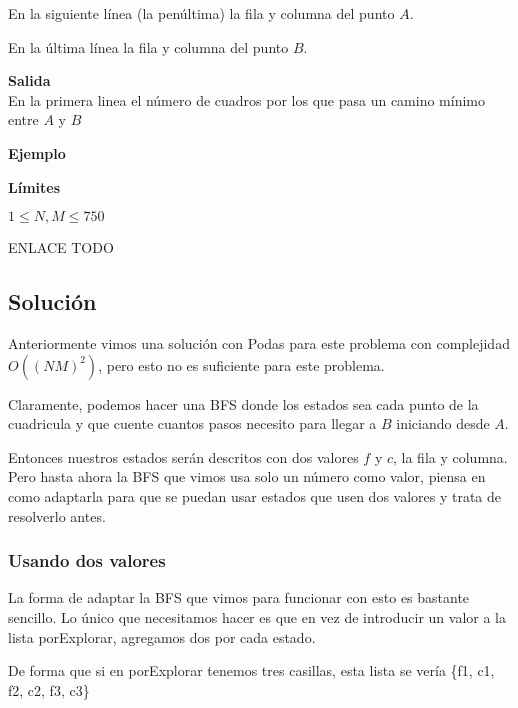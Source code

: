 En la siguiente línea (la penúltima) la fila y columna del punto \(A\).

En la última línea la fila y columna del punto \(B\).

\textbf{Salida}\\
En la primera linea el número de cuadros por los que pasa un camino mínimo entre \(A\) y \(B\)

\textbf{Ejemplo}\\
\begin{casebox2}
\end{casebox2}

\textbf{Límites}
\begin{plimits}
	\item \(1 \leq N, M\leq 750\)
\end{plimits}

ENLACE TODO

\subsection*{Solución}
Anteriormente vimos una solución con Podas para este problema con complejidad \(O((NM)^2)\), pero esto no es suficiente para este problema.

Claramente, podemos hacer una BFS donde los estados sea cada punto de la cuadricula y que cuente cuantos pasos necesito para llegar a \(B\) iniciando desde \(A\).

Entonces nuestros estados serán descritos con dos valores \(f\) y \(c\), la fila y columna. Pero hasta ahora la BFS que vimos usa solo un número como valor, piensa en como adaptarla para que se puedan usar estados que usen dos valores y trata de resolverlo antes.

\subsubsection*{Usando dos valores}
La forma de adaptar la BFS que vimos para funcionar con esto es bastante sencillo. Lo único que necesitamos hacer es que en vez de introducir un valor a la lista porExplorar, agregamos dos por cada estado.

De forma que si en porExplorar tenemos tres casillas, esta lista se vería \{f1, c1, f2, c2, f3, c3\}

